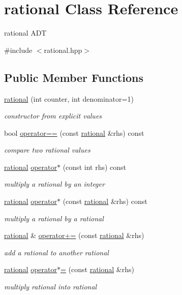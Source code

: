 \hypertarget{classrational}{}\section{rational Class Reference}
\label{classrational}


rational A\+DT  




{\ttfamily \#include $<$rational.\+hpp$>$}

\subsection*{Public Member Functions}
\begin{DoxyCompactItemize}
\item 
\hyperlink{classrational_a5f971ef33181044f54d8e4fee71cb957}{rational} (int counter, int denominator=1)
\begin{DoxyCompactList}\small\item\em constructor from explicit values \end{DoxyCompactList}\item 
bool \hyperlink{classrational_a8b565720ea15ddfb17ea202e27698478}{operator==} (const \hyperlink{classrational}{rational} \&rhs) const
\begin{DoxyCompactList}\small\item\em compare two rational values \end{DoxyCompactList}\item 
\hyperlink{classrational}{rational} \hyperlink{classrational_a9c0f08f8be5db907dc6d93ad3f5cb26b}{operator$\ast$} (const int rhs) const
\begin{DoxyCompactList}\small\item\em multiply a rational by an integer \end{DoxyCompactList}\item 
\hyperlink{classrational}{rational} \hyperlink{classrational_a1dd39ab2daf08ee68087fdbb37be258e}{operator$\ast$} (const \hyperlink{classrational}{rational} \&rhs) const
\begin{DoxyCompactList}\small\item\em multiply a rational by a rational \end{DoxyCompactList}\item 
\hyperlink{classrational}{rational} \& \hyperlink{classrational_a9b83ad0c803d2ac242b42e71d954a356}{operator+=} (const \hyperlink{classrational}{rational} \&rhs)
\begin{DoxyCompactList}\small\item\em add a rational to another rational \end{DoxyCompactList}\item 
\hyperlink{classrational}{rational} \hyperlink{classrational_a2b5729aef261d16cd18ff7c7fcbf8c6e}{operator$\ast$=} (const \hyperlink{classrational}{rational} \&rhs)
\begin{DoxyCompactList}\small\item\em multiply rational into rational \end{DoxyCompactList}\end{DoxyCompactItemize}

